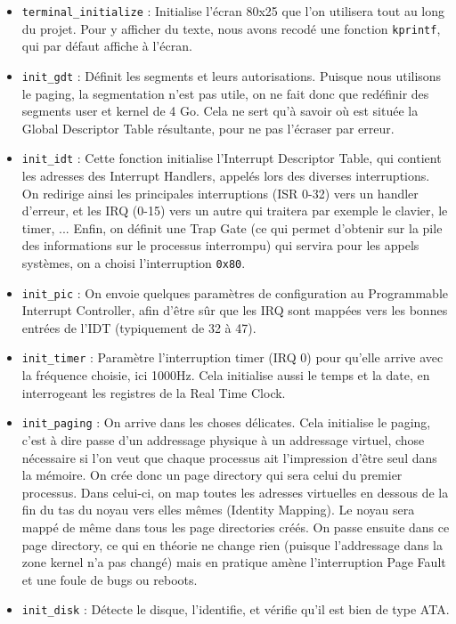 \documentclass[a4paper,10pt, french]{article}
\newcommand{\code}[1]{\texttt{#1}}
\begin{document}
\begin{itemize}
 \item \code{terminal\_initialize} : Initialise l'écran 80x25 que l'on utilisera tout au long du projet.
 Pour y afficher du texte, nous avons recodé une fonction \code{kprintf}, qui par défaut affiche à l'écran.
 \item \code{init\_gdt} : Définit les segments et leurs autorisations. Puisque nous utilisons le paging, 
 la segmentation n'est pas utile, on ne fait donc que redéfinir des segments user et kernel de 4 Go. Cela ne
 sert qu'à savoir où est située la Global Descriptor Table résultante, pour ne pas l'écraser par erreur.
 \item \code{init\_idt} : Cette fonction initialise l'Interrupt Descriptor Table, qui contient les adresses
 des Interrupt Handlers, appelés lors des diverses interruptions. On redirige ainsi les principales interruptions
 (ISR 0-32) vers un handler d'erreur, et les IRQ (0-15) vers un autre qui traitera par exemple le clavier, 
 le timer, ... Enfin, on définit une Trap Gate (ce qui permet d'obtenir sur la pile des informations sur le 
 processus interrompu) qui servira pour les appels systèmes, on a choisi l'interruption \code{0x80}.
 \item \code{init\_pic} : On envoie quelques paramètres de configuration au Programmable Interrupt Controller,
 afin d'être sûr que les IRQ sont mappées vers les bonnes entrées de l'IDT (typiquement de 32 à 47).
 \item \code{init\_timer} : Paramètre l'interruption timer (IRQ 0) pour qu'elle arrive avec la fréquence choisie, ici 1000Hz.
 Cela initialise aussi le temps et la date, en interrogeant les registres de la Real Time Clock.
 \item \code{init\_paging} : On arrive dans les choses délicates. Cela initialise le paging, c'est à dire 
 passe d'un addressage physique à un addressage virtuel, chose nécessaire si l'on veut que chaque processus ait l'impression
 d'être seul dans la mémoire. On crée donc un page directory qui sera celui du premier processus. Dans celui-ci, on 
 map toutes les adresses virtuelles en dessous de la fin du tas du noyau vers elles mêmes (Identity Mapping).
 Le noyau sera mappé de même dans tous les page directories créés. On passe ensuite dans ce page directory, ce qui
 en théorie ne change rien (puisque l'addressage dans la zone kernel n'a pas changé) mais en pratique amène l'interruption Page Fault
 et une foule de bugs ou reboots.
 \item \code{init\_disk} : Détecte le disque, l'identifie, et vérifie qu'il est bien de type ATA.

\end{itemize}
\end{document}

